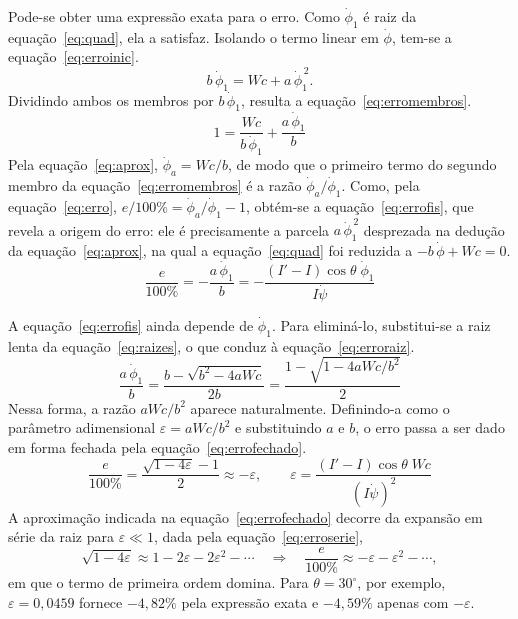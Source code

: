 \documentclass[12pt,a4paper]{article}
\newcommand{\phid}{\dot{\phi}}
\newcommand{\psid}{\dot{\psi}}
\newcommand{\eps}{\varepsilon}
\begin{document}
Pode-se obter uma expressão exata para o erro. Como $\phid_1$ é raiz da equação~\ref{eq:quad}, ela a satisfaz. Isolando o termo linear em $\phid$, tem-se a equação~\ref{eq:erroinic}.
\begin{equation}
b\,\phid_1 = Wc + a\,\phid_1^{\,2}.
\label{eq:erroinic}
\end{equation}
Dividindo ambos os membros por $b\,\phid_1$, resulta a equação~\ref{eq:erromembros}.
\begin{equation}
1 = \frac{Wc}{b\,\phid_1} + \frac{a\,\phid_1}{b}
\label{eq:erromembros}
\end{equation}
Pela equação~\ref{eq:aprox}, $\phid_a = Wc/b$, de modo que o primeiro termo do segundo membro da equação~\ref{eq:erromembros} é a razão $\phid_a/\phid_1$. Como, pela equação~\ref{eq:erro}, $e/100\% = \phid_a/\phid_1 - 1$, obtém-se a equação~\ref{eq:errofis}, que revela a origem do erro: ele é precisamente a parcela $a\,\phid_1^{\,2}$ desprezada na dedução da equação~\ref{eq:aprox}, na qual a equação~\ref{eq:quad} foi reduzida a $-b\,\phid + Wc = 0$.
\begin{equation}
\frac{e}{100\%} = -\frac{a\,\phid_1}{b} = -\frac{(I'-I)\cos\theta\;\phid_1}{I\psid}
\label{eq:errofis}
\end{equation}

A equação~\ref{eq:errofis} ainda depende de $\phid_1$. Para eliminá-lo, substitui-se a raiz lenta da equação~\ref{eq:raizes}, o que conduz à equação~\ref{eq:erroraiz}.
\begin{equation}
\frac{a\,\phid_1}{b}
= \frac{b-\sqrt{b^2-4aWc}}{2b}
= \frac{1-\sqrt{1-4aWc/b^2}}{2}
\label{eq:erroraiz}
\end{equation}
Nessa forma, a razão $aWc/b^2$ aparece naturalmente. Definindo-a como o parâmetro adimensional $\eps=aWc/b^2$ e substituindo $a$ e $b$, o erro passa a ser dado em forma fechada pela equação~\ref{eq:errofechado}.
\begin{equation}
\frac{e}{100\%} = \frac{\sqrt{1-4\eps}-1}{2} \approx -\eps,
\qquad
\eps = \frac{(I'-I)\cos\theta\;Wc}{\left(I\psid\right)^2}
\label{eq:errofechado}
\end{equation}
A aproximação indicada na equação~\ref{eq:errofechado} decorre da expansão em série da raiz para $\eps \ll 1$, dada pela equação~\ref{eq:erroserie},
\begin{equation}
\sqrt{1-4\eps} \approx 1 - 2\eps - 2\eps^2 - \cdots
\quad\Rightarrow\quad
\frac{e}{100\%} \approx -\eps - \eps^2 - \cdots,
\label{eq:erroserie}
\end{equation}
em que o termo de primeira ordem domina. Para $\theta = 30^\circ$, por exemplo, $\eps = 0,0459$ fornece $-4,82\%$ pela expressão exata e $-4,59\%$ apenas com $-\eps$.
\end{document}
